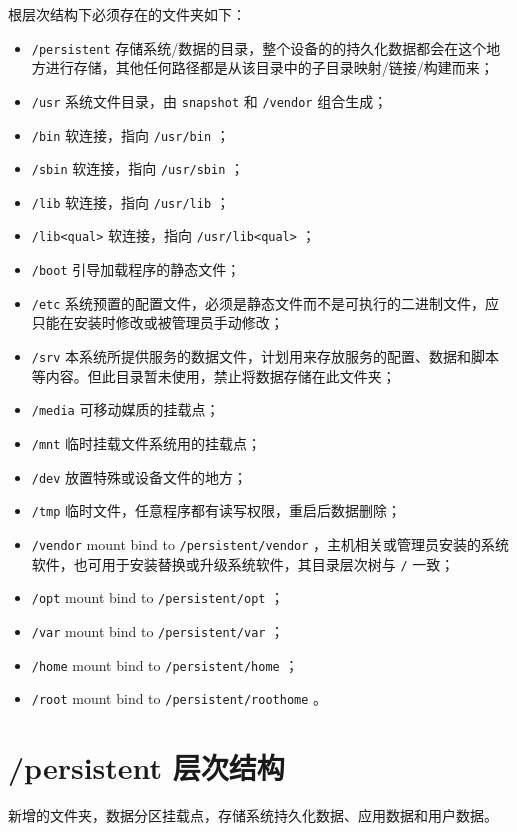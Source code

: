 \documentclass{utart}
\begin{document}
根层次结构下必须存在的文件夹如下：
\begin{itemize}[leftmargin=4em]
\item \texttt{/persistent} 存储系统/数据的目录，整个设备的的持久化数据都会在这个地方进行存储，其他任何路径都是从该目录中的子目录映射/链接/构建而来；
\item \texttt{/usr} 系统文件目录，由 \texttt{snapshot} 和 \texttt{/vendor} 组合生成；
\item \texttt{/bin} 软连接，指向 \texttt{/usr/bin} ；
\item \texttt{/sbin} 软连接，指向 \texttt{/usr/sbin} ；
\item \texttt{/lib} 软连接，指向 \texttt{/usr/lib} ；
\item \texttt{/lib<qual>} 软连接，指向 \texttt{/usr/lib<qual>} ；
\item \texttt{/boot} 引导加载程序的静态文件；
\item \texttt{/etc} 系统预置的配置文件，必须是静态文件而不是可执行的二进制文件，应只能在安装时修改或被管理员手动修改；
\item \texttt{/srv} 本系统所提供服务的数据文件，计划用来存放服务的配置、数据和脚本等内容。但此目录暂未使用，禁止将数据存储在此文件夹；
\item \texttt{/media} 可移动媒质的挂载点；
\item \texttt{/mnt} 临时挂载文件系统用的挂载点；
\item \texttt{/dev} 放置特殊或设备文件的地方；
\item \texttt{/tmp} 临时文件，任意程序都有读写权限，重启后数据删除；
\item \texttt{/vendor} mount bind to \texttt{/persistent/vendor} ，主机相关或管理员安装的系统软件，也可用于安装替换或升级系统软件，其目录层次树与 \texttt{/} 一致；
\item \texttt{/opt} mount bind to \texttt{/persistent/opt} ；
\item \texttt{/var} mount bind to \texttt{/persistent/var} ；
\item \texttt{/home} mount bind to \texttt{/persistent/home} ；
\item \texttt{/root} mount bind to \texttt{/persistent/roothome} 。
\end{itemize}

\section{/persistent 层次结构}
新增的文件夹，数据分区挂载点，存储系统持久化数据、应用数据和用户数据。
\end{document}
